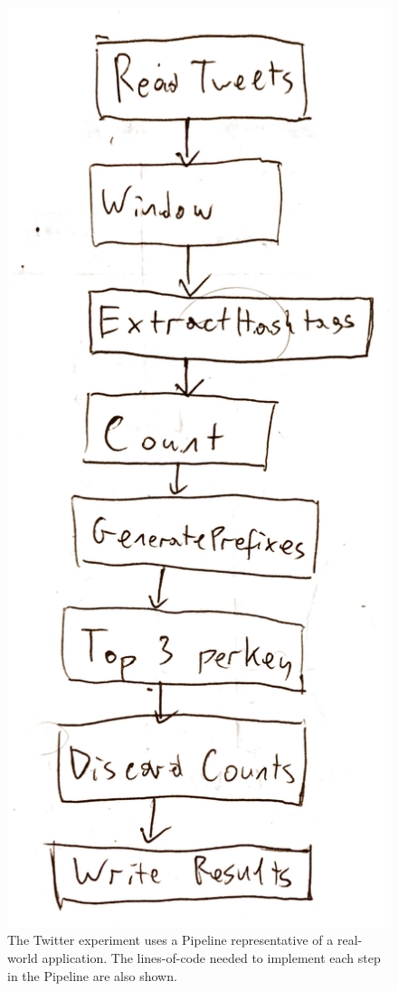 \begin{figure}
	\centering
	\includegraphics[height=0.5\textheight]{images/temp/eval-twitter-pipeline}
	\caption[The Twitter Pipeline as a Directed Acyclic Graph.]{The Twitter experiment uses a Pipeline representative of a real-world application. The lines-of-code needed to implement each step in the Pipeline are also shown.}
	\label{fig:eval:twitter-pipeline-dag}
\end{figure}


